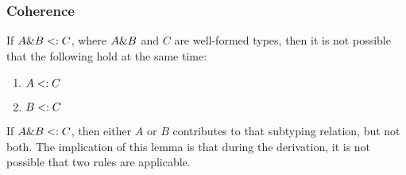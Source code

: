 \subsubsection{Coherence}


%


\begin{lemma}
  \label{unique-subtype-contributor}
  If $A \& B <: C$, where $A \& B$ and $C$ are well-formed types,
  then it is not possible that the following hold at the same time:
\begin{enumerate}
\item $A <: C$
\item $B <: C$
\end{enumerate}
\end{lemma}

If $A \& B <: C$, then either $A$ or $B$ contributes to that subtyping
relation, but not both. The implication of this lemma is that during the
derivation, it is not possible that two rules are applicable.

\newcommand{\wfinterlabel}{\textsc{WFInter}}


